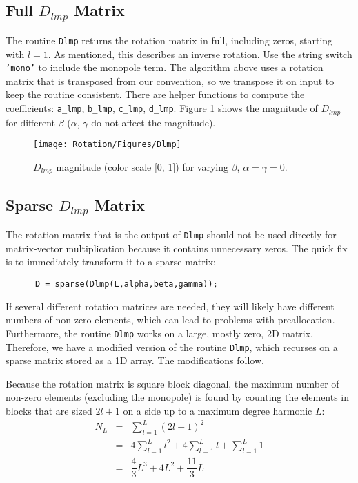 \subsection{Full $D_{lmp}$ Matrix}

The routine \texttt{Dlmp} returns the rotation matrix in full, including zeros, starting with $l=1$. As mentioned, this describes an inverse rotation. Use the string switch \texttt{'mono'} to include the monopole term. The algorithm above uses a rotation matrix that is transposed from our convention, so we transpose it on input to keep the routine consistent. There are helper functions to compute the coefficients: \texttt{a\_lmp}, \texttt{b\_lmp}, \texttt{c\_lmp}, \texttt{d\_lmp}.  Figure \ref{fig1} shows the magnitude of $D_{lmp}$ for different $\beta$ ($\alpha$, $\gamma$ do not affect the magnitude).  

\begin{figure}[H] 
   \centering
   \texttt{[image: Rotation/Figures/Dlmp]} 
   \caption{$D_{lmp}$ magnitude (color scale [0, 1]) for varying $\beta$, $\alpha = \gamma = 0$.}
   \label{fig1}
\end{figure}

{\footnotesize
{}
}


\newpage

\subsection{Sparse $D_{lmp}$ Matrix}

The rotation matrix that is the output of \texttt{Dlmp} should not be used directly for matrix-vector multiplication because it contains unnecessary zeros. The quick fix is to immediately transform it to a sparse matrix:

\begin{verbatim}
      D = sparse(Dlmp(L,alpha,beta,gamma));
\end{verbatim}

If several different rotation matrices are needed, they will likely have different numbers of non-zero elements, which can lead to problems with preallocation. Furthermore, the routine \texttt{Dlmp} works on a large, mostly zero, 2D matrix. Therefore, we have a modified version of the routine \texttt{Dlmp}, which recurses on a sparse matrix stored as a 1D array. The modifications follow.

Because the rotation matrix is square block diagonal, the maximum number of non-zero elements (excluding the monopole) is found by counting the elements in blocks that are sized $2l+1$ on a side up to a maximum degree harmonic $L$: 
\begin{eqnarray}
N_L &=& \sum_{l=1}^L (2l + 1)^2  \\
\ &=& 4 \sum_{l=1}^L l^2 + 4 \sum_{l=1}^L l + \sum_{l=1}^L 1 \\
\ &=& \dfrac{4}{3} L^3 + 4L^2 + \dfrac{11}{3}L 
\end{eqnarray}

